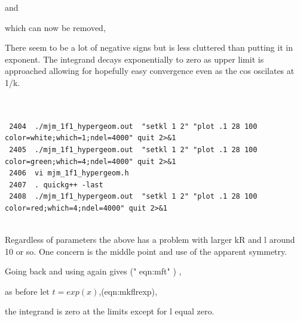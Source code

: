 and 

which can now be removed,


There seem to be a lot of negative signs but is less cluttered
than putting it in exponent. The integrand decays exponentially
to zero as upper limit is approached allowing for hopefully easy
convergence  even as the cos oscilates at 1/k.  

\begin{lstlisting}


 2404  ./mjm_1f1_hypergeom.out  "setkl 1 2" "plot .1 28 100 color=white;which=1;ndel=4000" quit 2>&1 
 2405  ./mjm_1f1_hypergeom.out  "setkl 1 2" "plot .1 28 100 color=green;which=4;ndel=4000" quit 2>&1 
 2406  vi mjm_1f1_hypergeom.h 
 2407  . quickg++ -last
 2408  ./mjm_1f1_hypergeom.out  "setkl 1 2" "plot .1 28 100 color=red;which=4;ndel=4000" quit 2>&1 


\end{lstlisting}


Regardless of parameters the above has a problem with larger kR and l around
10 or so. One concern is the middle point and use of the apparent symmetry.

Going back and using 
 again gives (" eqn:mft" ) ,






as before let $t=exp(x) $,(eqn:mkflrexp),

the integrand is zero at the limits  except for l equal zero.  

